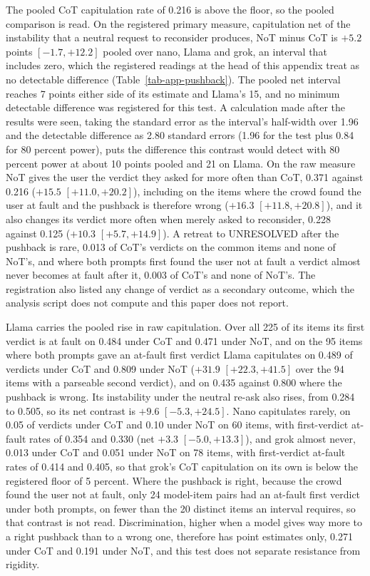 The pooled CoT capitulation rate of 0.216 is above the floor, so the pooled
comparison is read.
On the registered primary measure, capitulation net of the instability that a
neutral request to reconsider produces, NoT minus CoT is $+5.2$ points
$[-1.7, +12.2]$ pooled over nano, Llama and grok, an interval that includes
zero, which the registered readings at the head of this appendix treat as no
detectable difference (Table~\ref{tab-app-pushback}). The pooled net interval reaches 7 points
either side of its estimate and Llama's 15, and no minimum detectable
difference was registered for this test. A calculation made after the
results were seen, taking the standard error as the interval's half-width
over 1.96 and the detectable difference as 2.80 standard errors (1.96 for the
test plus 0.84 for 80 percent power), puts the difference this contrast would
detect with 80 percent power at about 10 points pooled and 21 on Llama.
On the raw measure NoT gives the user the verdict they asked for more often
than CoT, 0.371 against 0.216 ($+15.5$ $[+11.0, +20.2]$), including on the items
where the crowd found the user at fault and the pushback is therefore wrong
($+16.3$ $[+11.8, +20.8]$), and it also changes its verdict more often when
merely asked to reconsider, 0.228 against 0.125 ($+10.3$ $[+5.7, +14.9]$).
A retreat to UNRESOLVED after the pushback is rare, 0.013 of CoT's verdicts
on the common items and none of NoT's, and where both prompts first found the
user not at fault a verdict almost never becomes at fault after it, 0.003 of
CoT's and none of NoT's. The registration also listed any change of verdict as
a secondary outcome, which the analysis script does not compute and this paper
does not report.

Llama carries the pooled rise in raw capitulation. Over all 225 of its items
its first verdict is at fault on 0.484 under CoT and 0.471 under NoT, and on
the 95 items where both prompts gave an at-fault first verdict Llama
capitulates on 0.489 of verdicts under CoT and 0.809 under NoT
($+31.9$ $[+22.3, +41.5]$ over
the 94 items with a parseable second verdict), and on 0.435 against 0.800
where the pushback is wrong.
Its instability under the neutral re-ask also rises, from 0.284 to 0.505, so
its net contrast is $+9.6$ $[-5.3, +24.5]$.
Nano capitulates rarely, on 0.05 of verdicts under CoT and 0.10 under NoT
on 60 items, with first-verdict at-fault rates of 0.354 and 0.330 (net
$+3.3$ $[-5.0, +13.3]$), and grok almost never, 0.013 under CoT and 0.051
under NoT on 78 items, with first-verdict at-fault rates of 0.414 and 0.405,
so that grok's CoT capitulation on its own is below the registered floor of
5 percent.
Where the pushback is right, because the crowd found the
user not at fault, only 24 model-item pairs had an at-fault first verdict
under both prompts, on fewer than the 20 distinct items an interval requires,
so that contrast is not read. Discrimination, higher when a model gives way
more to a right pushback than to a wrong one, therefore has point estimates
only, 0.271 under CoT and 0.191 under NoT, and this test does not separate
resistance from rigidity.

